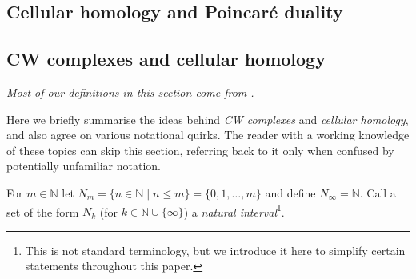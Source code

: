 \documentclass[12pt]{article}
\numberwithin{equation}{subsection}
\numberwithin{theorem}{subsection}
\numberwithin{lemma}{subsection}
\numberwithin{corollary}{subsection}
\numberwithin{definition}{subsection}
\numberwithin{example}{subsection}
\numberwithin{note}{subsection}
\newcommand{\nn}{\mathbb{N}}
\begin{document}
    \clearpage

    \begin{appendices}
            \section{Cellular homology and Poincaré duality} %
    \label{sec:appendix_cells}
    
        \subsection{CW complexes and cellular homology} %
        \label{sub:cw_complexes_and_cellular_homology}
    
            \emph{Most of our definitions in this section come from \cite{hatcher2002algebraic}.}

            Here we briefly summarise the ideas behind \emph{CW complexes} and \emph{cellular homology}, and also agree on various notational quirks.
            The reader with a working knowledge of these topics can skip this section, referring back to it only when confused by potentially unfamiliar notation.

            \begin{definition}
                For $m\in\nn$ let $N_m=\{n\in\nn \mid n\leqslant m\}=\{0,1,\ldots,m\}$ and define $N_\infty=\nn$.
                Call a set of the form $N_k$ (for $k\in\nn\cup\{\infty\}$) a \emph{natural interval}\footnote{
                    This is not standard terminology, but we introduce it here to simplify certain statements throughout this paper.
                }.
            \end{definition}


\end{appendices}
\end{document}
